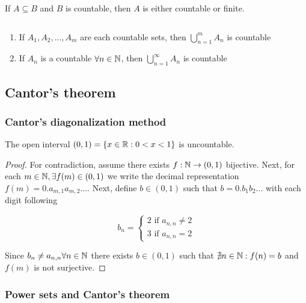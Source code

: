 \begin{theorem}
    If $A \subseteq B$ and $B$ is countable, then $A$ is either countable or finite.
\end{theorem}

\begin{theorem}
    $ $ \newline
    \begin{enumerate}
        \item If $A_1, A_2, ..., A_m$ are each countable sets, then $\bigcup \limits_{n=1}^m A_n$ is countable
        \item If $A_n$ is a countable $\forall n \in \mathbb{N}$, then $\bigcup \limits_{n=1}^\infty A_n$ is countable
    \end{enumerate}
\end{theorem}

\subsection{Cantor's theorem}

\subsubsection{Cantor's diagonalization method}

\begin{theorem}
    The open interval $(0,1) = \{ x \in \mathbb{R}: 0 < x < 1 \}$ is uncountable.    
\end{theorem}

\begin{proof}
    For contradiction, assume there exists $f: \mathbb{N} \to (0,1)$ bijective. Next, for each $m \in \mathbb{N}, \exists f(m) \in (0,1)$ we write the decimal representation $f(m) = 0.a_{m,1}a_{m,2}...$. Next, define $b \in (0,1)$ such that $b = 0.b_1b_2...$ with each digit following

    \begin{equation}
        b_n = \begin{cases}
            2 \text{ if } a_{n,n} \ne 2 \\
            3 \text{ if } a_{n,n} = 2
        \end{cases}
    \end{equation}

    Since $b_n \neq a_{n,n} \forall n \in \mathbb{N}$ there exists $b \in (0,1)$ such that $\nexists n \in \mathbb{N}: f(n) = b$ and $f(m)$ is not surjective.
\end{proof}

\subsubsection{Power sets and Cantor's theorem}

